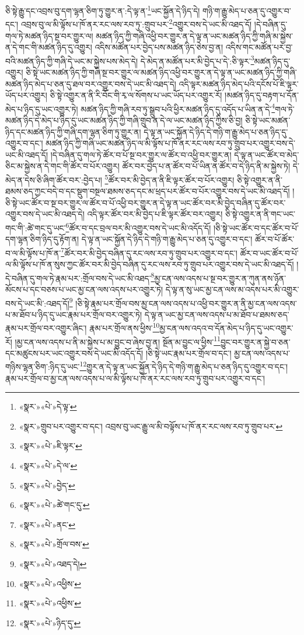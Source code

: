 ཅི་སྟེ་རྒྱུ་དང་འབྲས་བུ་དག་ལྷན་ཅིག་ཏུ་གྱུར་ན་:དེ་ལྟ་ན་\footnote{«སྣར་»«པེ་»དེ་ལྟ་}ཡང་སྐྱོན་དེ་ཉིད་དེ། གཉི་ག་རྒྱུ་མེད་པ་ཅན་དུ་འགྱུར་བ་དང་། འབྲས་བུ་ལ་མི་ལྟོས་པ་ཁོ་ནར་རང་ལས་རབ་ཏུ་:གྲུབ་པར་\footnote{«སྣར་»གྲུབ་པར་འགྱུར་བ་དང་། འབྲས་བུ་ཡང་རྒྱུ་ལ་མི་བལྟོས་པ་ཁོ་ནར་རང་ལས་རབ་ཏུ་གྲུབ་པར་}འགྱུར་བས་དེ་ཡང་མི་འཐད་དོ། །དེ་བཞིན་དུ་གལ་ཏེ་མཚན་ཉིད་སྔ་བར་གྱུར་ལ། མཚན་ཉིད་ཀྱི་གཞི་འཕྱི་བར་གྱུར་ན་དེ་ལྟ་ན་ཡང་མཚན་ཉིད་ཀྱི་གཞི་མ་སྐྱེས་ན་དེ་གང་གི་མཚན་ཉིད་དུ་འགྱུར། འདིས་མཚོན་པར་བྱེད་པས་མཚན་ཉིད་ཅེས་བྱ་ན། འདིས་གང་མཚོན་པར་བྱ་བའི་མཚན་ཉིད་ཀྱི་གཞི་དེ་ཡང་མ་སྐྱེས་པས་མེད་དེ། དེ་མེད་ན་མཚོན་པར་མི་བྱེད་པ་དེ་:ཅི་ལྟར་\footnote{«སྣར་»«པེ་»ཇི་ལྟར་}མཚན་ཉིད་དུ་འགྱུར། ཅི་སྟེ་ཡང་མཚན་ཉིད་ཀྱི་གཞི་སྔ་བར་གྱུར་ལ་མཚན་ཉིད་འཕྱི་བར་གྱུར་ན་དེ་ལྟ་ན་ཡང་མཚན་ཉིད་ཀྱི་གཞི་མཚན་ཉིད་མེད་པ་ཅན་དུ་ཐལ་བར་འགྱུར་བས་དེ་ཡང་མི་འཐད་དེ། འདི་ལྟར་མཚན་ཉིད་མེད་པའི་དངོས་པོ་ཇི་ལྟར་ཡོད་པར་འགྱུར། ཅི་སྟེ་འགྱུར་ན་ནི་རི་བོང་གི་རྭ་ལ་སོགས་པ་ཡང་ཡོད་པར་འགྱུར་རོ། །མཚན་ཉིད་དུ་བརྟག་པ་དོན་མེད་པ་ཉིད་དུ་ཡང་འགྱུར་ཏེ། མཚན་ཉིད་ཀྱི་གཞི་རབ་ཏུ་སྒྲུབ་པའི་ཕྱིར་མཚན་ཉིད་དུ་འདོད་པ་ཡིན་ན་དེ་\footnote{«སྣར་»«པེ་»དེ་ལ་}གལ་ཏེ་མཚན་ཉིད་དེ་མེད་པ་ཉིད་དུ་ཡང་མཚན་ཉིད་ཀྱི་གཞི་གྲུབ་ན་དེ་ལ་ཡང་མཚན་ཉིད་ཀྱིས་ཅི་བྱ། ཅི་སྟེ་ཡང་མཚན་ཉིད་དང་མཚན་ཉིད་ཀྱི་གཞི་དག་ལྷན་ཅིག་ཏུ་གྱུར་ན། དེ་ལྟ་ན་ཡང་སྐྱོན་དེ་ཉིད་དེ་གཉི་ག་རྒྱུ་མེད་པ་ཅན་ཉིད་དུ་འགྱུར་བ་དང་། མཚན་ཉིད་ཀྱི་གཞི་ཡང་མཚན་ཉིད་ལ་མི་ལྟོས་པ་ཁོ་ནར་རང་ལས་རབ་ཏུ་གྲུབ་པར་འགྱུར་བས་དེ་ཡང་མི་འཐད་དོ། །དེ་བཞིན་དུ་གལ་ཏེ་ཚོར་བ་པོ་སྔ་བར་གྱུར་ལ་ཚོར་བ་འཕྱི་བར་གྱུར་ན། དེ་ལྟ་ན་ཡང་ཚོར་བ་མེད་ཅིང་མ་སྐྱེས་ན་དེ་གང་གི་ཚོར་བ་པོར་འགྱུར། ཚོར་བར་བྱེད་པ་ན་ཚོར་བ་པོ་ཡིན་ན་ཚོར་བ་དེ་ཉིད་ནི་མ་སྐྱེས་ཏེ། དེ་མེད་ན་དེས་ཅི་ཞིག་ཚོར་བར་:བྱེད་པ། \footnote{«སྣར་»«པེ་»བྱེད་}ཚོར་བར་མི་བྱེད་ན་ནི་ཇི་ལྟར་ཚོར་བ་པོར་འགྱུར། ཅི་སྟེ་འགྱུར་ན་ནི་ཐམས་ཅད་ཀྱང་བདེ་བ་དང་སྡུག་བསྔལ་ཐམས་ཅད་དང་མ་ཕྲད་པར་ཚོར་བ་པོར་འགྱུར་བས་དེ་ཡང་མི་འཐད་དོ། །ཅི་སྟེ་ཡང་ཚོར་བ་སྔ་བར་གྱུར་ལ་ཚོར་བ་པོ་འཕྱི་བར་གྱུར་ན་དེ་ལྟ་ན་ཡང་ཚོར་བར་མི་བྱེད་བཞིན་དུ་ཚོར་བར་འགྱུར་བས་དེ་ཡང་མི་འཐད་དེ། འདི་ལྟར་ཚོར་བར་མི་བྱེད་པ་ཇི་ལྟར་ཚོར་བར་འགྱུར། ཅི་སྟེ་འགྱུར་ན་ནི་གང་ཡང་གང་གི་:ཚེ་གང་དུ་ཡང་\footnote{«སྣར་»«པེ་»ཚེ་གང་དུ་}ཚོར་བ་དང་བྲལ་བར་མི་འགྱུར་བས་དེ་ཡང་མི་འདོད་དོ། །ཅི་སྟེ་ཡང་ཚོར་བ་དང་ཚོར་བ་པོ་དག་ལྷན་ཅིག་ཉིད་དུ་རྟོག་ན། དེ་ལྟ་ན་ཡང་སྐྱོན་དེ་ཉིད་དེ་གཉི་ག་རྒྱུ་མེད་པ་ཅན་དུ་འགྱུར་བ་དང་། ཚོར་བ་པོ་ཚོར་བ་ལ་མི་ལྟོས་པ་ཁོ་ན་\footnote{«སྣར་»«པེ་»ནང་}ཚོར་བར་མི་བྱེད་བཞིན་དུ་རང་ལས་རབ་ཏུ་གྲུབ་པར་འགྱུར་བ་དང་། ཚོར་བ་ཡང་ཚོར་བ་པོ་ལ་མི་ལྟོས་པ་ཁོ་ན་སུས་ཀྱང་ཚོར་བར་མི་བྱེད་བཞིན་དུ་རང་ལས་རབ་ཏུ་གྲུབ་པར་འགྱུར་བས་དེ་ཡང་མི་འཐད་དོ། །དེ་བཞིན་དུ་གལ་ཏེ་རྣམ་པར་:གྲོལ་བས་དེ་ཡང་མི་འཐད་\footnote{«སྣར་»«པེ་»གྲོལ་བས་}མྱ་ངན་ལས་འདས་པ་སྔ་བར་གྱུར་ན་ཀུན་ནས་ཉོན་མོངས་པ་དང་བཅས་པ་ཡང་མྱ་ངན་ལས་འདས་པར་འགྱུར་ཏེ། དེ་ལྟ་ན་སུ་ཡང་མྱ་ངན་ལས་མ་འདས་པར་མི་འགྱུར་བས་དེ་ཡང་མི་:འཐད་དོ།\footnote{«སྣར་»«པེ་»འཐད་དེ།} །ཅི་སྟེ་རྣམ་པར་གྲོལ་བས་མྱ་ངན་ལས་འདས་པ་འཕྱི་བར་གྱུར་ན་ནི་མྱ་ངན་ལས་འདས་པ་མ་ཐོབ་པ་ཉིད་དུ་ཡང་རྣམ་པར་གྲོལ་བར་འགྱུར་ཏེ། དེ་ལྟ་ན་ཡང་མྱ་ངན་ལས་འདས་པ་མ་ཐོབ་པ་ཐམས་ཅད་རྣམ་པར་གྲོལ་བར་འགྱུར་ཞིང་། རྣམ་པར་གྲོལ་ནས་ཕྱིས་\footnote{«སྣར་»«པེ་»འཕྱིས་}མྱ་ངན་ལས་འདའ་བ་དོན་མེད་པ་ཉིད་དུ་ཡང་འགྱུར་རོ། །མྱ་ངན་ལས་འདས་པ་ནི་མ་སྐྱེས་པ་མ་བྱུང་བ་ཞེས་བྱ་ན། སྔོན་མ་བྱུང་ལ་ཕྱིས་\footnote{«སྣར་»«པེ་»འཕྱིས་}བྱུང་བར་གྱུར་ན་སྐྱེ་བ་ཅན་དང་མཚུངས་པར་ཡང་འགྱུར་བས་དེ་ཡང་མི་འདོད་དོ། །ཅི་སྟེ་ཡང་རྣམ་པར་གྲོལ་བ་དང་། མྱ་ངན་ལས་འདས་པ་གཉིས་ལྷན་ཅིག་:ཉིད་དུ་ཡང་\footnote{«སྣར་»«པེ་»ཉིད་དུ་}གྱུར་ན་དེ་ལྟ་ན་ཡང་སྐྱོན་དེ་ཉིད་དེ་གཉི་ག་རྒྱུ་མེད་པ་ཅན་ཉིད་དུ་འགྱུར་བ་དང་། རྣམ་པར་གྲོལ་བ་མྱ་ངན་ལས་འདས་པ་ལ་མི་ལྟོས་པ་ཁོ་ནར་རང་ལས་རབ་ཏུ་གྲུབ་པར་འགྱུར་བ་དང་། 